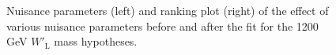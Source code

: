 \begin{figure}[H]
  \centering
  \caption{Nuisance parameters (left) and ranking plot (right) of the effect of various nuisance parameters before and after the fit for the 1200 GeV $W'_{\text{L}}$ mass hypotheses.}
  \label{fig:NuisParAndRanking_WpLH1200}
\end{figure}
